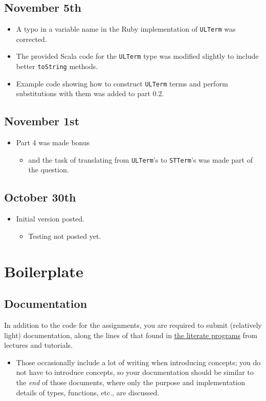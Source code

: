 \documentclass[11pt]{article}
\theoremstyle{definition}
\begin{document}
\subsection*{November 5th}
\label{sec:org2fbbbfa}
\begin{itemize}
\item A typo in a variable name in the Ruby implementation
of \texttt{ULTerm} was corrected.
\item The provided Scala code for the \texttt{ULTerm} type was modified
slightly to include better \texttt{toString} methods.
\item Example code showing how to construct \texttt{ULTerm} terms
and perform substitutions with them was added to part 0.2.
\end{itemize}

\subsection*{November 1st}
\label{sec:org0e762f0}
\begin{itemize}
\item Part 4 was made bonus
\begin{itemize}
\item and the task of translating from \texttt{ULTerm}'s to \texttt{STTerm}'s was
made part of the question.
\end{itemize}
\end{itemize}

\subsection*{October 30th}
\label{sec:orgbbb0796}
\begin{itemize}
\item Initial version posted.
\begin{itemize}
\item Testing not posted yet.
\end{itemize}
\end{itemize}

\section*{Boilerplate}
\label{sec:orgede5113}
\subsection*{Documentation}
\label{sec:org0fc2e11}
In addition to the code for the assignments,
you are required to submit (relatively light) documentation,
along the lines of that found in
\href{https://armkeh.github.io/principles-of-programming-languages/\#outline-container-Lecture-literate-programs}{the literate programs}
from lectures and tutorials.
\begin{itemize}
\item Those occasionally include a lot of writing when introducing concepts;
you do not have to introduce concepts, so your documentation
should be similar to the \emph{end} of those documents,
where only the purpose and implementation details
of types, functions, etc., are discussed.
\end{itemize}
\end{document}
